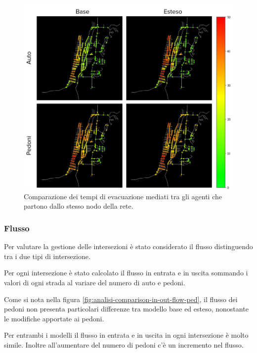 \begin{figure}[ht]
    \centering
    \includegraphics[width=\textwidth]{images/analisi/comparison-evtimes-map.png}
    \caption{Comparazione dei tempi di evacuazione mediati tra gli agenti che partono dallo stesso nodo della rete. }
    \label{fig:analisi-comparison-ev-times-map}
\end{figure}

\pagebreak


\subsubsection*{Flusso}
Per valutare la gestione delle intersezioni è stato considerato il flusso distinguendo tra i due tipi di intersezione.

Per ogni intersezione è stato calcolato il flusso in entrata e in uscita sommando i valori di ogni strada al variare del numero di auto e pedoni.

Come si nota nella figura \ref{fig:analisi-comparison-in-out-flow-ped},
il flusso dei pedoni non presenta particolari differenze tra modello base ed esteso, nonostante le modifiche apportate ai pedoni.

Per entrambi i modelli il flusso in entrata e in uscita in ogni intersezione è molto simile.
Inoltre all'aumentare del numero di pedoni c'è un incremento nel flusso.


